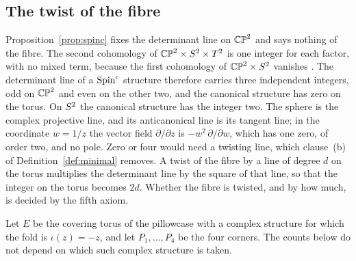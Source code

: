 \documentclass[11pt,a4paper]{article}
\theoremstyle{plain}
\theoremstyle{definition}
\theoremstyle{remark}
\begin{document}
\subsection{The twist of the fibre}\label{sec:twist}

Proposition~\ref{prop:spinc} fixes the determinant line on $\mathbb{CP}^2$ and says nothing of the fibre. The second cohomology of $\mathbb{CP}^2\times S^2\times T^2$ is one integer for each factor, with no mixed term, because the first cohomology of $\mathbb{CP}^2\times S^2$ vanishes \cite{Hatcher}. The determinant line of a $\text{Spin}^c$ structure therefore carries three independent integers, odd on $\mathbb{CP}^2$ and even on the other two, and the canonical structure has zero on the torus. On $S^2$ the canonical structure has the integer two. The sphere is the complex projective line, and its anticanonical line is its tangent line; in the coordinate $w=1/z$ the vector field $\partial/\partial z$ is $-w^{2}\,\partial/\partial w$, which has one zero, of order two, and no pole. Zero or four would need a twisting line, which clause~(b) of Definition~\ref{def:minimal} removes. A twist of the fibre by a line of degree $d$ on the torus multiplies the determinant line by the square of that line, so that the integer on the torus becomes $2d$. Whether the fibre is twisted, and by how much, is decided by the fifth axiom.

Let $E$ be the covering torus of the pillowcase with a complex structure for which the fold is $\iota(z)=-z$, and let $P_{1},\dots,P_{4}$ be the four corners. The counts below do not depend on which such complex structure is taken.
\end{document}
